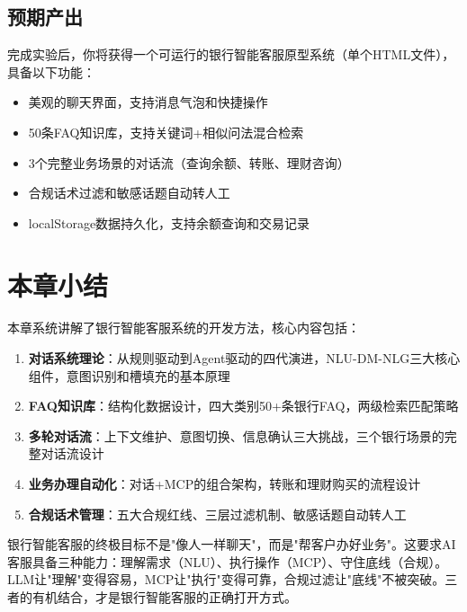 \subsection{预期产出}

完成实验后，你将获得一个可运行的银行智能客服原型系统（单个HTML文件），具备以下功能：

\begin{itemize}[leftmargin=2em]
  \item 美观的聊天界面，支持消息气泡和快捷操作
  \item 50条FAQ知识库，支持关键词+相似问法混合检索
  \item 3个完整业务场景的对话流（查询余额、转账、理财咨询）
  \item 合规话术过滤和敏感话题自动转人工
  \item localStorage数据持久化，支持余额查询和交易记录
\end{itemize}

\section{本章小结}

本章系统讲解了银行智能客服系统的开发方法，核心内容包括：

\begin{enumerate}[leftmargin=2em]
  \item \textbf{对话系统理论}：从规则驱动到Agent驱动的四代演进，NLU-DM-NLG三大核心组件，意图识别和槽填充的基本原理
  \item \textbf{FAQ知识库}：结构化数据设计，四大类别50+条银行FAQ，两级检索匹配策略
  \item \textbf{多轮对话流}：上下文维护、意图切换、信息确认三大挑战，三个银行场景的完整对话流设计
  \item \textbf{业务办理自动化}：对话+MCP的组合架构，转账和理财购买的流程设计
  \item \textbf{合规话术管理}：五大合规红线、三层过滤机制、敏感话题自动转人工
\end{enumerate}

\begin{theorybox}
银行智能客服的终极目标不是"像人一样聊天"，而是"帮客户办好业务"。这要求AI客服具备三种能力：理解需求（NLU）、执行操作（MCP）、守住底线（合规）。LLM让"理解"变得容易，MCP让"执行"变得可靠，合规过滤让"底线"不被突破。三者的有机结合，才是银行智能客服的正确打开方式。
\end{theorybox}

